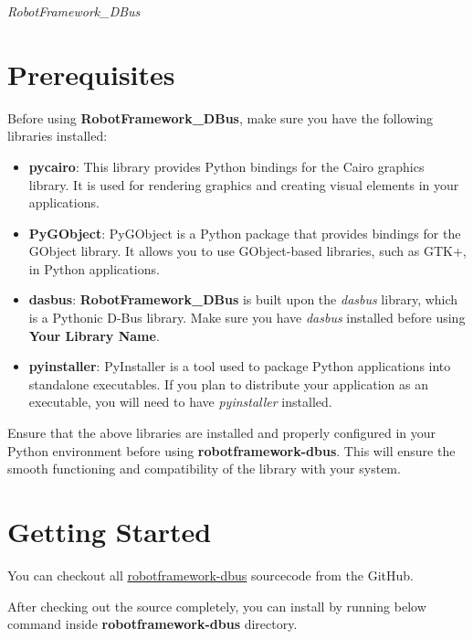 %
%

\emph{RobotFramework\_DBus}

\hypertarget{prerequisites}{%
\section{Prerequisites}\label{prerequisites}}

Before using \textbf{RobotFramework\_DBus}, make sure you have the following libraries installed:

\begin{itemize}
  \item \textbf{pycairo}: This library provides Python bindings for the Cairo graphics library. It is used for rendering graphics and creating visual elements in your applications.
  \item \textbf{PyGObject}: PyGObject is a Python package that provides bindings for the GObject library. It allows you to use GObject-based libraries, such as GTK+, in Python applications.
  \item \textbf{dasbus}: \textbf{RobotFramework\_DBus} is built upon the \textit{dasbus} library, which is a Pythonic D-Bus library. Make sure you have \textit{dasbus} installed before using \textbf{Your Library Name}.
  \item \textbf{pyinstaller}: PyInstaller is a tool used to package Python applications into standalone executables. If you plan to distribute your application as an executable, you will need to have \textit{pyinstaller} installed.
\end{itemize}

Ensure that the above libraries are installed and properly configured in your Python environment before using \textbf{robotframework-dbus}. This will ensure the smooth functioning and compatibility of the library with your system.

\hypertarget{getting-started}{%
\section{Getting Started}\label{getting-started}}

You can checkout all
\href{https://github.com/test-fullautomation/robotframework-dbus/}{robotframework-dbus}
sourcecode from the GitHub.

After checking out the source completely, you can install by running
below command inside \textbf{robotframework-dbus} directory.

